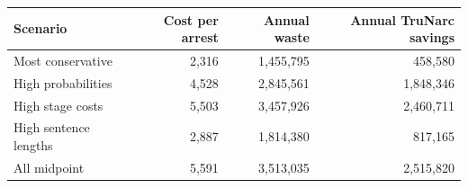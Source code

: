 \begin{tabular}{@{}l r r r@{}}
\hline
Scenario & Cost per arrest & Annual waste & Annual TruNarc savings \\
\hline
Most conservative & 2,316 & 1,455,795 & 458,580 \\
High probabilities & 4,528 & 2,845,561 & 1,848,346 \\
High stage costs & 5,503 & 3,457,926 & 2,460,711 \\
High sentence lengths & 2,887 & 1,814,380 & 817,165 \\
All midpoint & 5,591 & 3,513,035 & 2,515,820 \\
\hline
\end{tabular}
